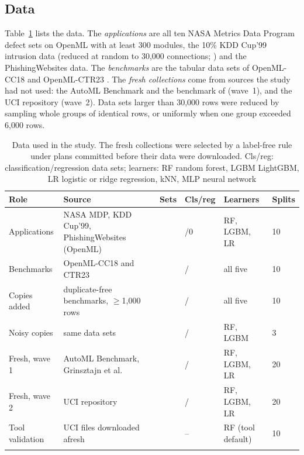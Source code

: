\subsection{Data}
Table~\ref{tab:data} lists the data. The \emph{applications} are all ten NASA Metrics Data Program defect sets on OpenML with at least 300 modules, the 10\% KDD Cup'99 intrusion data (reduced at random to 30,000 connections; \citealp{tavallaee2009}) and the PhishingWebsites data. The \emph{benchmarks} are the \NNTotal{} tabular data sets of OpenML-CC18 \citep{bischl2021} and OpenML-CTR23 \citep{fischer2023}. The \emph{fresh collections} come from sources the study had not used: the AutoML Benchmark \citep{gijsbers2024} and the benchmark of \citet{grinsztajn2022} (wave~1), and the UCI repository \citep{kelly_uci} (wave~2). Data sets larger than 30,000 rows were reduced by sampling whole groups of identical rows, or uniformly when one group exceeded 6,000 rows.

\begin{table}[t]
\caption{Data used in the study. The fresh collections were selected by a label-free rule under plans committed before their data were downloaded. Cls/reg: classification/regression data sets; learners: RF random forest, LGBM LightGBM, LR logistic or ridge regression, kNN, MLP neural network}\label{tab:data}
\centering\footnotesize
\setlength{\tabcolsep}{3pt}
\begin{tabularx}{\textwidth}{@{}lXrlll@{}}
\toprule
Role & Source & Sets & Cls/reg & Learners & Splits\\
\midrule
Applications & NASA MDP, KDD Cup'99, PhishingWebsites (OpenML) & \NCsNFlagTotal{} & \NCsNFlagTotal{}/0 & RF, LGBM, LR & 10\\
Benchmarks & OpenML-CC18 and CTR23 & \NNTotal{} & \NNCls{}/\NNReg{} & all five & 10\\
Copies added & duplicate-free benchmarks, $\ge$1,000 rows & \NNdN{} & \NInjNDsCla{}/\NInjNDsReg{} & all five & 10\\
Noisy copies & same data sets & \NNdN{} & \NInjNDsCla{}/\NInjNDsReg{} & RF, LGBM & 3\\
Fresh, wave 1 & AutoML Benchmark, Grinsztajn et al. & \NPrN{} & \NPrNCls{}/\NPrNReg{} & RF, LGBM, LR & 20\\
Fresh, wave 2 & UCI repository & \NWTwoN{} & \NWTwoNCls{}/\NWTwoNReg{} & RF, LGBM, LR & 20\\
Tool validation & UCI files downloaded afresh & \NTvN{} & -- & RF (tool default) & 10\\
\botrule
\end{tabularx}
\end{table}

